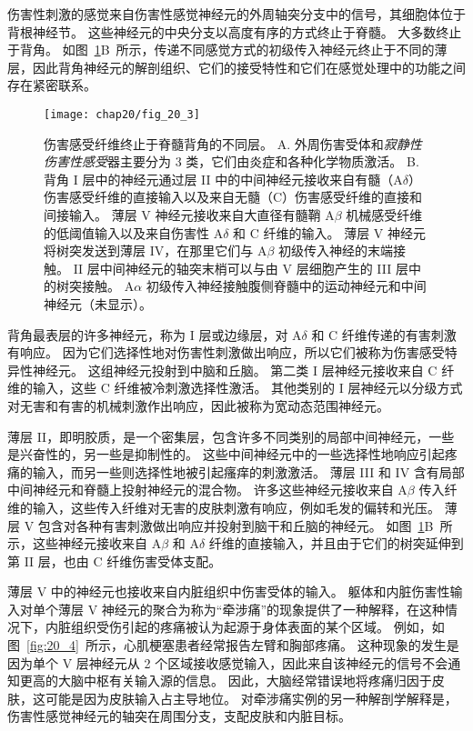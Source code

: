 伤害性刺激的感觉来自伤害性感觉神经元的外周轴突分支中的信号，其细胞体位于背根神经节。
这些神经元的中央分支以高度有序的方式终止于脊髓。
大多数终止于背角。
如图~\ref{fig:20_3}B~所示，传递不同感觉方式的初级传入神经元终止于不同的薄层，因此背角神经元的解剖组织、它们的接受特性和它们在感觉处理中的功能之间存在紧密联系。


\begin{figure}[htbp]
	\centering
	\texttt{[image: chap20/fig\_20\_3]}
	\caption{伤害感受纤维终止于脊髓背角的不同层。
		A. 外周伤害受体和\textit{寂静性伤害性感受}器主要分为 3 类，它们由炎症和各种化学物质激活。
		B. 背角 I 层中的神经元通过层 II 中的中间神经元接收来自有髓（A$ \delta $）伤害感受纤维的直接输入以及来自无髓（C）伤害感受纤维的直接和间接输入。
		薄层 V 神经元接收来自大直径有髓鞘 A$ \beta $ 机械感受纤维的低阈值输入以及来自伤害性 A$ \delta $ 和 C 纤维的输入。
		薄层 V 神经元将树突发送到薄层 IV，在那里它们与 A$ \beta $ 初级传入神经的末端接触。
		II 层中间神经元的轴突末梢可以与由 V 层细胞产生的 III 层中的树突接触。
		A$ \alpha $ 初级传入神经接触腹侧脊髓中的运动神经元和中间神经元（未显示）\cite{fields1987painful}。}
	\label{fig:20_3}
\end{figure}


背角最表层的许多神经元，称为 I 层或边缘层，对 A$ \delta $ 和 C 纤维传递的有害刺激有响应。
因为它们选择性地对伤害性刺激做出响应，所以它们被称为伤害感受特异性神经元。
这组神经元投射到中脑和丘脑。
第二类 I 层神经元接收来自 C 纤维的输入，这些 C 纤维被冷刺激选择性激活。
其他类别的 I 层神经元以分级方式对无害和有害的机械刺激作出响应，因此被称为宽动态范围神经元。


薄层 II，即明胶质，是一个密集层，包含许多不同类别的局部中间神经元，一些是兴奋性的，另一些是抑制性的。
这些中间神经元中的一些选择性地响应引起疼痛的输入，而另一些则选择性地被引起瘙痒的刺激激活。
薄层 III 和 IV 含有局部中间神经元和脊髓上投射神经元的混合物。
许多这些神经元接收来自 A$ \beta $ 传入纤维的输入，这些传入纤维对无害的皮肤刺激有响应，例如毛发的偏转和光压。
薄层 V 包含对各种有害刺激做出响应并投射到脑干和丘脑的神经元。
如图~\ref{fig:20_3}B~所示，这些神经元接收来自 A$ \beta $ 和 A$\delta$ 纤维的直接输入，并且由于它们的树突延伸到第 II 层，也由 C 纤维伤害受体支配。


薄层 V 中的神经元也接收来自内脏组织中伤害受体的输入。
躯体和内脏伤害性输入对单个薄层 V 神经元的聚合为称为“牵涉痛”的现象提供了一种解释，在这种情况下，内脏组织受伤引起的疼痛被认为起源于身体表面的某个区域。 
例如，如图~\ref{fig:20_4}~所示，心肌梗塞患者经常报告左臂和胸部疼痛。
这种现象的发生是因为单个 V 层神经元从 2 个区域接收感觉输入，因此来自该神经元的信号不会通知更高的大脑中枢有关输入源的信息。
因此，大脑经常错误地将疼痛归因于皮肤，这可能是因为皮肤输入占主导地位。
对牵涉痛实例的另一种解剖学解释是，伤害性感觉神经元的轴突在周围分支，支配皮肤和内脏目标。


